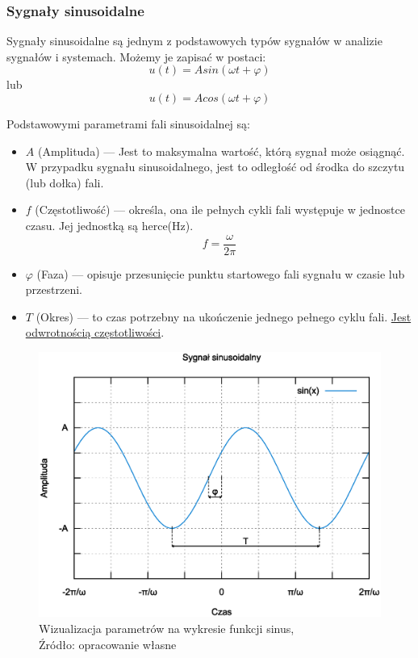 \documentclass{article}
\begin{document}
    \subsubsection{Sygnały sinusoidalne}
    Sygnały sinusoidalne są jednym z podstawowych typów sygnałów w analizie sygnałów i systemach. Możemy je zapisać w postaci:
    \begin{equation}
      u(t) = Asin(\omega t + \varphi)
    \end{equation}
    lub
    \begin{equation}
      u(t) = Acos(\omega t + \varphi)
    \end{equation}

    \pagebreak
    \fancyfoot[L]{}

    Podstawowymi parametrami fali sinusoidalnej są:
    \begin{itemize}
      \item $A$ (Amplituda) --- Jest to maksymalna wartość, którą sygnał może osiągnąć. W przypadku sygnału sinusoidalnego, jest to odległość od środka do szczytu (lub dołka) fali.
      \item $f$ (Częstotliwość) ---  określa, ona ile pełnych cykli fali występuje w jednostce czasu. Jej jednostką są herce(Hz).
      \begin{equation}
        f = \frac{\omega}{2\pi}
      \end{equation}
      \item $\varphi$ (Faza) --- opisuje przesunięcie punktu startowego fali sygnału w czasie lub przestrzeni.
      \item $T$ (Okres) --- to czas potrzebny na ukończenie jednego pełnego cyklu fali. \underline{Jest odwrotnością częstotliwości}.
    \end{itemize}

    \begin{figure}[!ht]
      \begin{center}
          \includegraphics[scale=0.5]{grafiki/sinus.eps}
          \caption{Wizualizacja parametrów na wykresie funkcji sinus,\\Źródło: opracowanie własne}
      \end{center}
    \end{figure}
  
\end{document}
